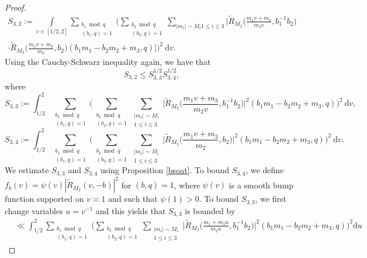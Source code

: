 \documentclass[12pt]{amsart}
\theoremstyle{definition}
\theoremstyle{plain}
\theoremstyle{remark}
\numberwithin{equation}{section}
\numberwithin{theorem}{section}
\numberwithin{equation}{section}
\begin{document}
\begin{proof}
		\begin{align*}
			S_{3,2}:=\int\limits_{ v \in [1/2, 2]}\sum_{\substack{b_1 \bmod q \\ (b_{1}, q)=1 }}\Bigg(\sum_{\substack{ b_2 \bmod q \\ (b_{2}, q)=1 }}\sum_{|m_{i}|\sim M_{i} 1\leq i \leq 3}\Bigg|\tilde{R}_{M_{2}}\bigg(\frac{m_{1}v+m_{3}}{m_{2}v}, b_{1}^{-1}b_{2}\bigg)
			\\
			\cdot\tilde{R}_{M_{2}}\bigg(\frac{m_{1}v+m_{3}}{m_{2}}, b_{2}\bigg)(b_{1}m_{1}-b_{2}m_{2}+m_{3},q)\Bigg|\Bigg)^{2}\:\mathrm{d}v.
		\end{align*}
		Using the Cauchy-Schwarz inequality again, we have that
		\begin{equation}\label{S32cs}
			S_{3, 2} \leq S_{3,3}^{1/2}S_{3,4}^{1/2},
		\end{equation}
		where
		\[
		S_{3,3}:=\int_{1/2}^{2}\sum_{\substack{b_1 \bmod q \\ (b_{1}, q)=1 }}\bigg(\sum_{\substack{b_2 \bmod q \\ (b_{2}, q)=1 }}\sum_{\substack{|m_{i}|\sim M_{i} \\ 1\leq i \leq 3}}\bigg|\tilde{R}_{M_{2}}\bigg(\frac{m_{1}v+m_{3}}{m_{2}v}, b_{1}^{-1}b_{2}\bigg)
		\bigg|^{2}(b_{1}m_{1}-b_{2}m_{2}+m_{3},q)\bigg)^{2}\:\mathrm{d}v,\]
		\[
		S_{3,4}:=\int_{1/2}^{2}\sum_{\substack{ b_1 \bmod q \\ (b_{1}, q)=1 }}\bigg(\sum_{\substack{b_2 \bmod q \\ (b_{2}, q)=1 }}\sum_{\substack{|m_{i}|\sim M_{i} \\ 1\leq i \leq 3}}\bigg|\tilde{R}_{M_{2}}\bigg(\frac{m_{1}v+m_{3}}{m_{2}}, b_{2}\bigg)
		\bigg|^{2}(b_{1}m_{1}-b_{2}m_{2}+m_{3},q)\bigg)^{2}\:\mathrm{d}v.\]
		We estimate $S_{3,3}$ and $S_{3,4}$ using Proposition \ref{bsoat}. To bound $S_{3,4}$, we define $f_{b}(v)=\psi(v)|\tilde{R}_{M_{2}}(v, -b)|^{2}$ for $(b,q) = 1$, where $\psi(v)$ is a smooth bump function supported on $v \asymp 1$ and such that $\psi(1)>0$. To bound $S_{3,3}$, we first change variables $u=v^{-1}$ and this yields that $S_{3,3}$ is bounded by
		\begin{align*}
			&\ll \int_{1/2}^{2}\sum_{\substack{b_1 \bmod q \\ (b_{1}, q)=1 }}\bigg(\sum_{\substack{b_2 \bmod q \\ (b_{2}, q)=1 }}\sum_{\substack{|m_{i}|\sim M_{i} \\ 1\leq i \leq 3}}\bigg|\tilde{R}_{M_{2}}\bigg(\frac{m_{1}+m_{3}u}{m_{2}u}, b_{1}^{-1}b_{2}\bigg)
			\bigg|^{2}(b_{1}m_{1}-b_{2}m_{2}+m_{3},q)\bigg)^{2}\mathrm{d}u

\end{align*}
\end{proof}
\end{document}
